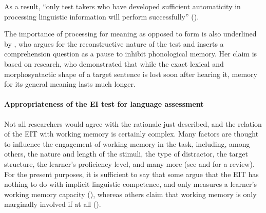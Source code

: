 As a result, “only test takers who have developed sufficient automaticity in processing linguistic information will perform successfully” (\citealt[332]{Van-Moere2012}). 

The importance of processing for meaning as opposed to form is also underlined by \citet{Erlam2006}, who argues for the reconstructive nature of the test and inserts a comprehension question as a pause to inhibit phonological memory. Her claim is based on  research, who demonstrated that while the exact lexical and morphosyntactic shape of a target sentence is lost soon after hearing it, memory for its general meaning lasts much longer.

\paragraph{Appropriateness of the EI test for language assessment}

Not all researchers would agree with the rationale just described, and the relation of the EIT with working memory is certainly complex. Many factors are thought to influence the engagement of working memory in the task, including, among others, the nature and length of the stimuli, the type of distractor, the target structure, the learner's proficiency level, and many more (see \citealt{Vinther2002} and \citealt{Erlam2006} for a review). For the present purposes, it is sufficient to say that some argue that the EIT has nothing to do with implicit linguistic competence, and only measures a learner's working memory capacity (\citealt{JessopEtAl2007}), whereas others claim that working memory is only marginally involved if at all (\citealt{OkuraLonsdale2012}).

